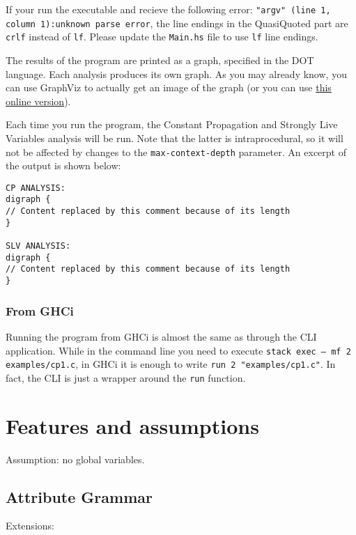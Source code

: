 \documentclass{article}
\begin{document}
If your run the executable and recieve the following error: \texttt{"argv" (line 1, column 1):unknown parse error}, the line endings in the QuasiQuoted part are \texttt{crlf} instead of \texttt{lf}.
Please update the \texttt{Main.hs} file to use \texttt{lf} line endings.

The results of the program are printed as a graph, specified in the DOT language.
Each analysis produces its own graph.
As you may already know, you can use GraphViz to actually get an image of the graph (or you can use \href{http://www.webgraphviz.com/}{this online version}).

Each time you run the program, the Constant Propagation and Strongly Live Variables analysis will be run.
Note that the latter is intraprocedural, so it will not be affected by changes to the \texttt{max-context-depth} parameter.
An excerpt of the output is shown below:

\begin{verbatim}
CP ANALYSIS:
digraph {
// Content replaced by this comment because of its length
}

SLV ANALYSIS:
digraph {
// Content replaced by this comment because of its length
}
\end{verbatim}

\subsubsection*{From GHCi}

Running the program from GHCi is almost the same as through the CLI application. While in the command line you need to execute \texttt{stack exec -- mf 2 examples/cp1.c}, in GHCi it is enough to write \texttt{run 2 "examples/cp1.c"}. In fact, the CLI is just a wrapper around the \texttt{run} function.

\section*{Features and assumptions}


Assumption: no global variables.

\subsection*{Attribute Grammar}

Extensions:
\end{document}
